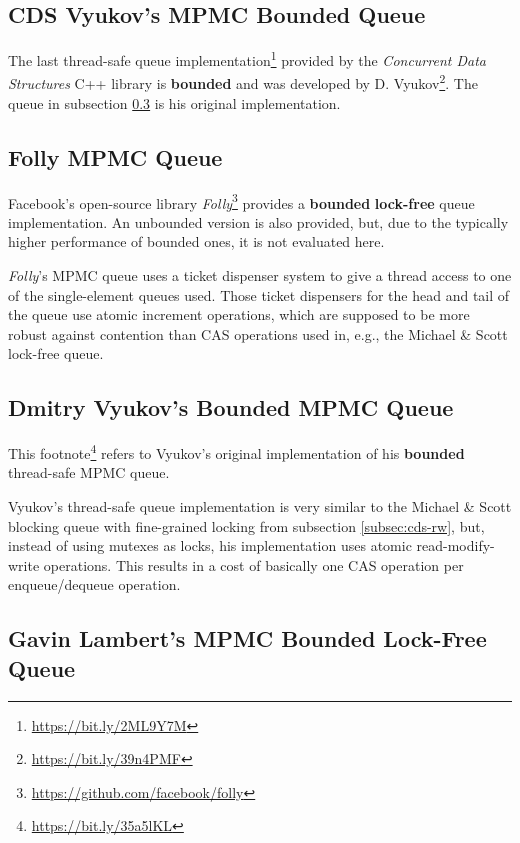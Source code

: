 \subsection[CDS VyukovMPMCCycleQueue]{CDS Vyukov's MPMC Bounded Queue} \label{subsec:cds-vyukovmpmccycle}

	The last thread-safe queue implementation\footnote{\url{https://bit.ly/2ML9Y7M}} provided by the \textit{Concurrent Data Structures} C++ library is \textbf{bounded} and was developed by D. Vyukov\footnote{\url{https://bit.ly/39n4PMF}}. The queue in subsection \ref{subsec:vyukov} is his original implementation.

\subsection[Folly MPMC Queue]{Folly MPMC Queue} \label{subsec:folly-mpmc}

	Facebook's open-source library \textit{Folly}\footnote{\url{https://github.com/facebook/folly}} provides a \textbf{bounded} \textbf{lock-free} queue implementation. An unbounded version is also provided, but, due to the typically higher performance of bounded ones, it is not evaluated here.
	
	\textit{Folly}'s MPMC queue uses a ticket dispenser system to give a thread access to one of the single-element queues used. Those ticket dispensers for the head and tail of the queue use atomic increment operations, which are supposed to be more robust against contention than CAS operations used in, e.g., the Michael \& Scott lock-free queue.

\subsection[Dmitry Vyukov's MPMC Queue]{Dmitry Vyukov's Bounded MPMC Queue} \label{subsec:vyukov}

	This footnote\footnote{\url{https://bit.ly/35a5lKL}} refers to Vyukov's original implementation of his \textbf{bounded} thread-safe MPMC queue.

	Vyukov's thread-safe queue implementation is very similar to the Michael \& Scott blocking queue with fine-grained locking from subsection \ref{subsec:cds-rw}, but, instead of using mutexes as locks, his implementation uses atomic read-modify-write operations. This results in a cost of basically one CAS operation per enqueue/dequeue operation.

\subsection[Gavin Lambert's MPMC Queue]{Gavin Lambert's MPMC Bounded Lock-Free Queue} \label{subsec:lampert}

